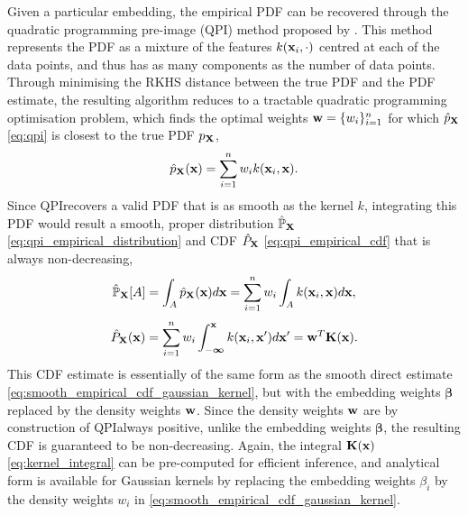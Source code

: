 \documentclass[twoside]{article} \usepackage{aistats2017}
\theoremstyle{definition}
\theoremstyle{theorem}
\newcommand{\rv}[1]{{#1}}
\newcommand{\qpi}{QPI}
\begin{document}
	Given a particular embedding, the empirical PDF can be recovered through the quadratic programming pre-image (\qpi) method proposed by \cite{mccalman2013multi}. This method represents the PDF as a mixture of the features $k(\mathbf{x}_{i}, \cdot)$ centred at each of the data points, and thus has as many components as the number of data points. Through minimising the RKHS distance between the true PDF and the PDF estimate, the resulting algorithm reduces to a tractable quadratic programming optimisation problem, which finds the optimal weights $\mathbf{w} = \{w_{i}\}_{i = 1}^{n}$ for which $\hat{p}_{\bvec{\rv{X}}}$ \eqref{eq:qpi} is closest to the true PDF $p_{\bvec{\rv{X}}}$,
	\begin{equation}
		\hat{p}_{\bvec{\rv{X}}}(\bvec{x}) = \sum_{i = 1}^{n} w_{i} k(\bvec{x}_{i}, \bvec{x}).
	\label{eq:qpi}
	\end{equation}
	Since \qpi\space recovers a valid PDF that is as smooth as the kernel $k$, integrating this PDF would result a smooth, proper distribution $\hat{\mathbb{P}}_{\bvec{\rv{X}}}$ \eqref{eq:qpi_empirical_distribution} and CDF $\hat{P}_{\bvec{\rv{X}}}$ \eqref{eq:qpi_empirical_cdf} that is always non-decreasing,
	\begin{equation}
		\hat{\mathbb{P}}_{\bvec{\rv{X}}}[A] = \int_{A} \hat{p}_{\bvec{\rv{X}}}(\bvec{x}) d\bvec{x} = \sum_{i = 1}^{n} w_{i} \int_{A} k(\bvec{x}_{i}, \bvec{x}) d\bvec{x},
	\label{eq:qpi_empirical_distribution}
	\end{equation}
	\begin{equation}
		\hat{P}_{\bvec{\rv{X}}}(\bvec{x}) = \sum_{i = 1}^{n} w_{i} \int_{-\bm{\infty}}^{\bvec{x}} k(\bvec{x}_{i}, \bvec{x}') d\bvec{x}' =  \bvec{w}^{T} \bvec{K}(\bvec{x}).
	\label{eq:qpi_empirical_cdf}
	\end{equation}
	This CDF estimate is essentially of the same form as the smooth direct estimate \eqref{eq:smooth_empirical_cdf_gaussian_kernel}, but with the embedding weights $\bm{\beta}$ replaced by the density weights $\mathbf{w}$. Since the density weights $\mathbf{w}$ are by construction of \qpi\space always positive, unlike the embedding weights $\bm{\beta}$, the resulting CDF is guaranteed to be non-decreasing. Again, the integral $\mathbf{K}(\mathbf{x})$ \eqref{eq:kernel_integral} can be pre-computed for efficient inference, and analytical form is available for Gaussian kernels by replacing the embedding weights $\beta_{i}$ by the density weights $w_{i}$ in \eqref{eq:smooth_empirical_cdf_gaussian_kernel}.
\end{document}
